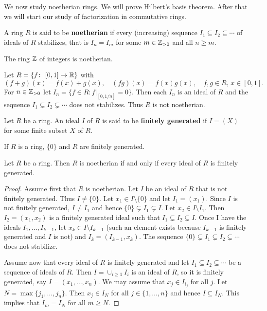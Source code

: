 \chapter{}


We now study noetherian rings. We will prove Hilbert's basis 
theorem. After that we will start our study of factorization
in commutative rings. 

\begin{definition}
	A ring $R$ is said to be \textbf{noetherian} if every (increasing)
	sequence $I_1\subseteq I_2\subseteq\cdots$ of ideals of $R$
	stabilizes, that is $I_n=I_m$ for some $m\in\mathbb{Z}_{>0}$ and all $n\geq m$. 
\end{definition}

The ring $\mathbb{Z}$ of integers is noetherian.

\begin{exercise}
Let $R=\{f\colon [0,1]\to\R\}$ with 
\[
(f+g)(x)=f(x)+g(x),
\quad
(fg)(x)=f(x)g(x),
\quad
f,g\in R,\,x\in [0,1].
\]
For $n\in\mathbb{Z}_{>0}$ let
$I_n=\{f\in R:f|_{[0,1/n]}=0\}$. Then each $I_n$ is an ideal of $R$ and 
the sequence 
$I_1\subsetneq I_2\subsetneq\cdots$ 
does not stabilizes. Thus $R$ is not noetherian. 
\end{exercise}

\begin{definition}
	Let $R$ be a ring. An ideal $I$ of $R$ is said to be \textbf{finitely generated} if $I=(X)$ for some
	finite subset $X$ of $R$. 
\end{definition}

If $R$ is a ring, $\{0\}$ and $R$ are finitely generated. 

\begin{proposition}
Let $R$ be a ring. Then $R$ is noetherian if and only 
if every ideal of $R$ is finitely generated. 	
\end{proposition}

\begin{proof}
	Assume first that $R$ is noetherian. Let $I$ be an ideal of $R$ that is not finitely generated. 
	Thus $I\ne\{0\}$. Let $x_1\in I\setminus\{0\}$ and let $I_1=(x_1)$. Since $I$ is not finitely
	generated, $I\ne I_1$ and hence   
	$\{0\}\subsetneq I_1\subsetneq I$. Let $x_2\in I\setminus I_1$. Then
	$I_2=(x_1,x_2)$ is a finitely generated ideal such that 
	$I_1\subsetneq I_2\subsetneq I$.	 Once I have the ideals $I_1,\dots,I_{k-1}$, let 
	$x_k\in I\setminus I_{k-1}$ (such an element exists because $I_{k-1}$ is finitely generated
	and $I$ is not) and $I_k=(I_{k-1},x_k)$. The sequence
	$\{0\}\subsetneq I_1\subsetneq I_2\subsetneq\cdots$ does not stabilize.  
	
	Assume now that every ideal of $R$ is finitely generated and 
	let $I_1\subseteq I_2\subseteq\cdots$ be a sequence of ideals of $R$. Then
	$I=\cup_{i\geq1}I_i$ is an ideal of $R$, so it is finitely generated, say
	$I=(x_1,\dots,x_n)$. We may assume that $x_j\in I_{i_j}$ for all $j$. Let 
	$N=\max\{j_1,\dots,j_n\}$. Then 
	$x_j\in I_N$ for all $j\in\{1,\dots,n\}$ 
	and hence $I\subseteq I_N$. This implies that 
	$I_m=I_N$ for all $m\geq N$. 
\end{proof}


